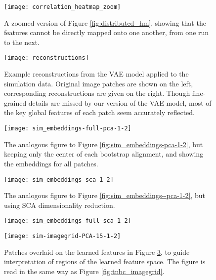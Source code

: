 \begin{figure}
\texttt{[image: correlation\_heatmap\_zoom]}
\caption{A zoomed version of Figure \ref{fig:distributed_hm}, showing that the
  features cannot be directly mapped onto one another, from one run to the
  next.}
\label{fig:distributed_hm_subset}
\end{figure}

\begin{figure}
\texttt{[image: reconstructions]}
\caption{Example reconstructions from the VAE model applied to the simulation
  data. Original image patches are shown on the left, corresponding
  reconstructions are given on the right. Though fine-grained details are missed
  by our version of the VAE model, most of the key global features of each patch
  seem accurately reflected.}
\label{fig:reconstructions}
\end{figure}

\begin{figure}
  \centering
  \texttt{[image: sim\_embeddings-full-pca-1-2]}
  \caption{The analogous figure to Figure \ref{fig:sim_embeddings-pca-1-2}, but
    keeping only the center of each bootstrap alignment, and showing the
    embeddings for all patches.}
  \label{fig:sim_embeddings-full-pca-1-2}
\end{figure}

\begin{figure}
  \centering
  \texttt{[image: sim\_embeddings--sca-1-2]}
  \caption{The analogous figure to Figure \ref{fig:sim_embeddings--pca-1-2}, but
    using SCA dimensionality reduction.}
  \label{fig:sim_embeddings--sca-1-2}
\end{figure}

\begin{figure}
  \centering
  \texttt{[image: sim\_embeddings-full-sca-1-2]}
  \caption{}
  \label{sim_embeddings-full-sca-1-2}
\end{figure}

\begin{figure}
  \centering
  \texttt{[image: sim-imagegrid-PCA-15-1-2]}
  \caption{Patches overlaid on the learned features in Figure
    \ref{fig:sim_embeddings-full-pca-1-2}, to guide interpretation of regions of
    the learned feature space. The figure is read in the same way as Figure
    \ref{fig:tnbc_imagegrid}.}
  \label{fig:sim_imagegrid-PCA-15-1-2}
\end{figure}

